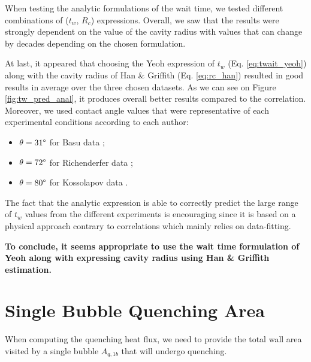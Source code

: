 \npar
When testing the analytic formulations of the wait time, we tested different combinations of ($t_{w}$, $R_{c}$) expressions. Overall, we saw that the results were strongly dependent on the value of the cavity radius with values that can change by decades depending on the chosen formulation.

\npar
At last, it appeared that choosing the Yeoh \etal expression of $t_{w}$ (Eq. \ref{eq:twait_yeoh}) along with the cavity radius of Han \& Griffith (Eq. \ref{eq:rc_han}) resulted in good results in average over the three chosen datasets. As we can see on Figure \ref{fig:tw_pred_anal}, it produces overall better results compared to the correlation. Moreover, we used contact angle values that were representative of each experimental conditions according to each author:

\begin{itemize}
\item $\theta = 31 \degree$ for Basu \etal data \cite{basu_wall_2005-1} ;
\item $\theta = 72 \degree$ for Richenderfer data \cite{richenderfer_experimental_2018};
\item $\theta = 80 \degree$ for Kossolapov data \cite{kossolapov_experimental_2021}.
\end{itemize} 

The fact that the analytic expression is able to correctly predict the large range of $t_{w}$ values from the different experiments is encouraging since it is based on a physical approach contrary to correlations which mainly relies on data-fitting.

\npar
\textbf{To conclude, it seems appropriate to use the wait time formulation of Yeoh \etal along with expressing cavity radius using Han \& Griffith estimation.}







\section{Single Bubble Quenching Area}
\label{sec:quench_area}

When computing the quenching heat flux, we need to provide the total wall area visited by a single bubble $A_{q,1b}$ that will undergo quenching.

